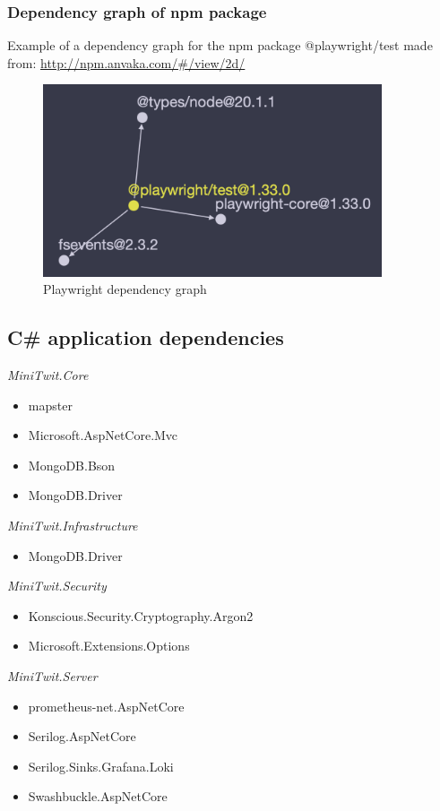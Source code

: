 \subsubsection{Dependency graph of npm package}
Example of a dependency graph for the npm package @playwright/test made from: \url{http://npm.anvaka.com/\#/view/2d/}

\begin{figure}[H]
    \centering
    \includegraphics[width=10cm]{Report/img/playwrightDependency.png}
    \caption{Playwright dependency graph}
    \label{fig:playwrightDependencies}
\end{figure}


\subsection{C\# application dependencies}

\textit{MiniTwit.Core}
\begin{itemize}
    \item mapster
    \item Microsoft.AspNetCore.Mvc
    \item MongoDB.Bson
    \item MongoDB.Driver
\end{itemize}


\textit{MiniTwit.Infrastructure}
\begin{itemize}
    \item MongoDB.Driver
\end{itemize}

\textit{MiniTwit.Security}
\begin{itemize}
    \item Konscious.Security.Cryptography.Argon2
    \item Microsoft.Extensions.Options
\end{itemize}

\textit{MiniTwit.Server}
\begin{itemize}
    \item prometheus-net.AspNetCore  
    \item Serilog.AspNetCore    
    \item Serilog.Sinks.Grafana.Loki   
    \item Swashbuckle.AspNetCore 
\end{itemize}



